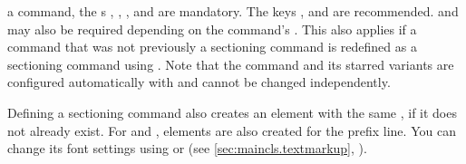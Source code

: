 \begin{description}
  a command, the  s
  , , , and 
  are mandatory. The keys 
  , and 
  are recommended.  and
   may also be required depending on the command's
  . This also applies if a command that was not previously a
  sectioning command is redefined as a sectioning command using
  . Note that the
   command and its starred variants are configured automatically
  with  and cannot be changed independently.
\end{description}
Defining a sectioning command also creates an element with the same
, if it does not already exist. For  and
, elements are also created for the prefix line. You can change
its font settings using  or
 (see \autoref{sec:maincls.textmarkup},
).
  
